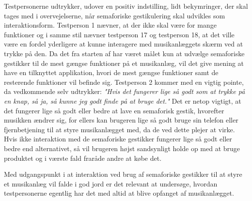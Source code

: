 Testpersonerne udtrykker, udover en positiv indstilling, lidt bekymringer, der skal tages med i overvejelserne, når semaforiske gestikulering skal udvikles som interaktionsform. Testperson 1 nævner, at der ikke skal være for mange funktioner og i samme stil nævner testperson 17 og testperson 18, at det ville være en fordel yderligere at kunne interagere med musikanlæggets skærm ved at trykke på den. Da det fra starten af har været målet kun at udvælge semaforiske gestikker til de mest gængse funktioner på et musikanlæg, vil det give mening at have en tilknyttet applikation, hvori de mest gængse funktioner samt de resterende funktioner vil befinde sig. Testperson 2 kommer med en vigtig pointe, da vedkommende selv udtrykker: \textsl{"Hvis det fungerer lige så godt som at trykke på en knap, så ja, så kunne jeg godt finde på at bruge det."} Det er netop vigtigt, at det fungerer lige så godt eller bedre at lave en semaforisk gestik, hvorefter musikken ændrer sig, for ellers kan brugeren lige så godt bruge sin telefon eller fjernbetjening til at styre musikanlægget med, da de ved dette plejer at virke. Hvis ikke interaktion med de semaforiske gestikker fungerer lige så godt eller bedre end alternativet, så vil brugeren højst sandsynligt holde op med at bruge produktet og i værste fald fraråde andre at købe det.

Med udgangspunkt i at interaktion ved brug af semaforiske gestikker til at styre et musikanlæg vil falde i god jord er det relevant at undersøge, hvordan testpersonerne egentlig har det med altid at blive opfanget af musikanlægget.

